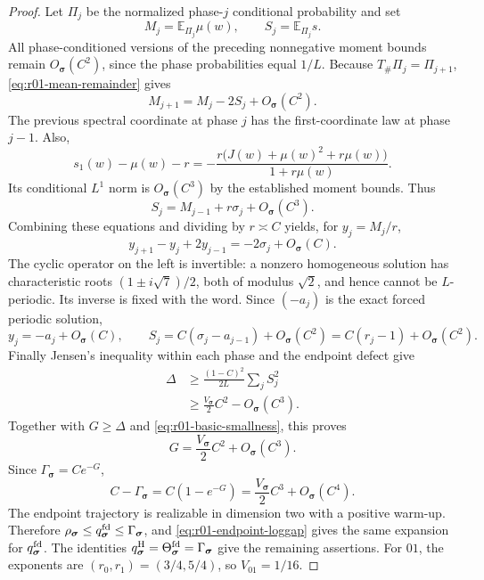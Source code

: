 \begin{proof}
Let $\Pi_j$ be the normalized phase-$j$ conditional probability and set
\[
 M_j=\mathbb E_{\Pi_j}\mu(w),\qquad
 S_j=\mathbb E_{\Pi_j}s.
\]
All phase-conditioned versions of the preceding nonnegative moment bounds
remain $O_{\bm\sigma}(C^2)$, since the phase probabilities equal $1/L$.
Because $T_\#\Pi_j=\Pi_{j+1}$, \eqref{eq:r01-mean-remainder} gives
\begin{equation}\label{eq:r01-phase-update}
 M_{j+1}=M_j-2S_j+O_{\bm\sigma}(C^2).
\end{equation}
The previous spectral coordinate at phase $j$ has the first-coordinate
law at phase $j-1$.  Also,
\[
 s_1(w)-\mu(w)-r
 =-\frac{r\bigl(J(w)+\mu(w)^2+r\mu(w)\bigr)}{1+r\mu(w)}.
\]
Its conditional $L^1$ norm is $O_{\bm\sigma}(C^3)$ by the established
moment bounds.  Thus
\begin{equation}\label{eq:r01-phase-selector}
 S_j=M_{j-1}+r\sigma_j+O_{\bm\sigma}(C^3).
\end{equation}
Combining these equations and dividing by $r\asymp C$ yields, for
$y_j=M_j/r$,
\[
 y_{j+1}-y_j+2y_{j-1}
 =-2\sigma_j+O_{\bm\sigma}(C).
\]
The cyclic operator on the left is invertible: a nonzero homogeneous
solution has characteristic roots $(1\pm i\sqrt7)/2$, both of modulus
$\sqrt2$, and hence cannot be $L$-periodic.  Its inverse is fixed with the
word.  Since $(-a_j)$ is the exact forced periodic solution,
\[
 y_j=-a_j+O_{\bm\sigma}(C),\qquad
 S_j=C(\sigma_j-a_{j-1})+O_{\bm\sigma}(C^2)
    =C(r_j-1)+O_{\bm\sigma}(C^2).
\]
Finally Jensen's inequality within each phase and the endpoint defect give
\begin{align*}
 \Delta
 &\ge\frac{(1-C)^2}{2L}\sum_j S_j^2\\
 &\ge\frac{V_{\bm\sigma}}2C^2-O_{\bm\sigma}(C^3).
\end{align*}
Together with $G\ge\Delta$ and
\eqref{eq:r01-basic-smallness}, this proves
\[
 G=\frac{V_{\bm\sigma}}2C^2+O_{\bm\sigma}(C^3).
\]
Since $\Gamma_{\bm\sigma}=Ce^{-G}$,
\[
 C-\Gamma_{\bm\sigma}
 =C(1-e^{-G})
 =\frac{V_{\bm\sigma}}2C^3+O_{\bm\sigma}(C^4).
\]
The endpoint trajectory is realizable in dimension two with a positive
warm-up.  Therefore
$\rho_{\bm\sigma}\le q^{\rm fd}_{\bm\sigma}\le\Gamma_{\bm\sigma}$,
and \eqref{eq:r01-endpoint-loggap} gives the same expansion for
$q^{\rm fd}_{\bm\sigma}$.  The identities
$q^{\rm H}_{\bm\sigma}=\Theta^{\rm fd}_{\bm\sigma}=\Gamma_{\bm\sigma}$
give the remaining assertions.  For $01$, the exponents are
$(r_0,r_1)=(3/4,5/4)$, so $V_{01}=1/16$.
\end{proof}


